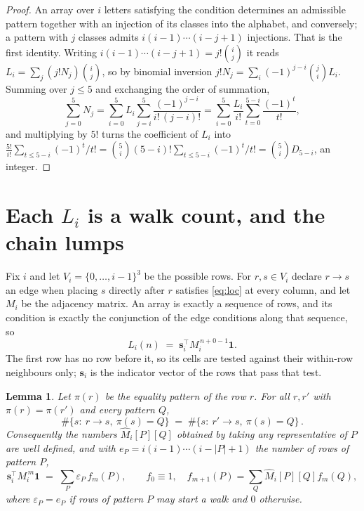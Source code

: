 \documentclass[11pt,a4paper]{article}
\theoremstyle{plain}
\newtheorem{lemma}[theorem]{Lemma}
\theoremstyle{definition}
\begin{document}
\begin{proof}
An array over $i$ letters satisfying the condition determines an admissible pattern together
with an injection of its classes into the alphabet, and conversely; a pattern with $j$
classes admits $i(i-1)\cdots(i-j+1)$ injections. That is the first identity. Writing
$i(i-1)\cdots(i-j+1)=j!\binom{i}{j}$ it reads $L_i=\sum_j (j!N_j)\binom{i}{j}$, so by
binomial inversion $j!N_j=\sum_{i}(-1)^{j-i}\binom{j}{i}L_i$. Summing over
$j\le 5$ and exchanging the order of summation,
\[
\sum_{j=0}^{5}N_j=\sum_{i=0}^{5}L_i\sum_{j=i}^{5}\frac{(-1)^{j-i}}{i!\,(j-i)!}
=\sum_{i=0}^{5}\frac{L_i}{i!}\sum_{t=0}^{5-i}\frac{(-1)^t}{t!} ,
\]
and multiplying by $5!$ turns the coefficient of $L_i$ into
$\frac{5!}{i!}\sum_{t\le 5-i}(-1)^t/t!=\binom{5}{i}(5-i)!\sum_{t\le 5-i}(-1)^t/t!
=\binom{5}{i}D_{5-i}$, an integer.
\end{proof}

\section{Each $L_i$ is a walk count, and the chain lumps}

Fix $i$ and let $V_i=\{0,\dots,i-1\}^{3}$ be the possible rows. For $r,s\in V_i$
declare $r\to s$ an edge when placing $s$ directly after $r$ satisfies \eqref{eq:loc} at
every column, and let $M_i$ be the adjacency matrix. An array is exactly a sequence of
rows, and its condition is exactly the conjunction of the edge conditions along that
sequence, so
\[
L_i(n)\;=\;\mathbf{s}_i^{\!\top}M_i^{\,n+0-1}\mathbf{1} .
\]
The first row has no row before it, so its cells are tested
against their within-row neighbours only; $\mathbf{s}_i$ is the indicator vector of the
rows that pass that test.

\begin{lemma}\label{lem:lump}
Let $\pi(r)$ be the equality pattern of the row $r$. For all $r,r'$ with
$\pi(r)=\pi(r')$ and every pattern $Q$,
\[
\#\{s:\ r\to s,\ \pi(s)=Q\}\;=\;\#\{s:\ r'\to s,\ \pi(s)=Q\}\, .
\]
Consequently the numbers $\widehat M_i[P][Q]$ obtained by taking any representative of $P$
are well defined, and with $e_P=i(i-1)\cdots(i-|P|+1)$ the number of rows of pattern $P$,
\[
\mathbf{s}_i^{\!\top}M_i^{\,m}\mathbf{1}\;=\;\sum_P \varepsilon_P\,f_m(P),
\qquad f_0\equiv1,\quad f_{m+1}(P)=\sum_Q\widehat M_i[P][Q]f_m(Q),
\]
where $\varepsilon_P=e_P$ if rows of pattern $P$ may start a walk and $0$ otherwise.
\end{lemma}
\end{document}
